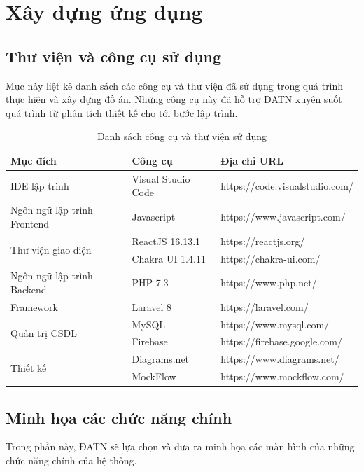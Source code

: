 \documentclass[../DoAn.tex]{subfiles}
\begin{document}
\section{Xây dựng ứng dụng}
\subsection{Thư viện và công cụ sử dụng}
Mục này liệt kê danh sách các công cụ và thư viện đã sử dụng trong quá trình thực hiện và xây dựng đồ án. Những công cụ này đã hỗ trợ ĐATN xuyên suốt quá trình từ phân tích thiết kế cho tới bước lập trình.
\begin{table}[H]
\centering
\begin{tabular}{|p{3.5cm}|p{3.6cm}|p{5.5cm}|}
\hline
Mục đích                            & Công cụ            & Địa chỉ URL                    \\ \hline
IDE lập trình                       & Visual Studio Code & https://code.visualstudio.com/ \\ \hline
Ngôn ngữ lập trình Frontend         & Javascript         & https://www.javascript.com/    \\ \hline
\multirow{2}{*}{Thư viện giao diện} & ReactJS 16.13.1      & https://reactjs.org/           \\ \cline{2-3} 
                                    & Chakra UI 1.4.11   & https://chakra-ui.com/         \\ \hline
Ngôn ngữ lập trình Backend          & PHP 7.3            & https://www.php.net/           \\ \hline
Framework                           & Laravel 8          & https://laravel.com/           \\ \hline
\multirow{2}{*}{Quản trị CSDL}      & MySQL              & https://www.mysql.com/         \\ \cline{2-3} 
                                    & Firebase           & https://firebase.google.com/   \\ \hline
\multirow{2}{*}{Thiết kế}      & Diagrams.net             & https://www.diagrams.net/          \\ \cline{2-3} 
& MockFlow           & https://www.mockflow.com/   \\ \hline
\end{tabular}
\caption{Danh sách công cụ và thư viện sử dụng}
\label{tab:my-table}
\end{table}
\newpage
\subsection{Minh họa các chức năng chính}
Trong phần này, ĐATN sẽ lựa chọn và đưa ra minh họa các màn hình của những chức năng chính của hệ thống.
\end{document}
